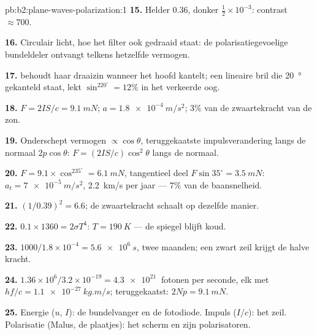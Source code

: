 \begin{solution}{pb:b2:plane-waves-polarization:1}
\textbf{15.} Helder $0.36$, donker $\tfrac12 \times 10^{-3}$: contrast
$\approx 700$.

\textbf{16.} Circulair licht, hoe het filter ook gedraaid staat: de
polarisatiegevoelige bundeldeler ontvangt telkens hetzelfde vermogen.

\textbf{17.}  behoudt haar draaizin wanneer het hoofd
kantelt; een lineaire bril die \qty{20}{\degree} gekanteld staat, lekt
$\sin^220^\circ = 12\%$ in het verkeerde oog.

\textbf{18.} $F = 2IS/c = \qty{9.1}{mN}$; $a = \qty{1.8e-4}{m/s^2}$; $3\%$
van de zwaartekracht van de zon.

\textbf{19.} Onderschept vermogen $\propto\cos\theta$, teruggekaatste
impulsverandering langs de normaal $2p\cos\theta$: $F = (2IS/c)\cos^2\theta$
langs de normaal.

\textbf{20.} $F = 9.1 \times \cos^235^\circ = \qty{6.1}{mN}$, tangentieel
deel $F\sin35^\circ
= \qty{3.5}{mN}$: $a_t = \qty{7e-5}{m/s^2}$,
\qty{2.2}{km/s} per jaar --- $7\%$ van de baansnelheid.

\textbf{21.} $(1/0.39)^2 = 6.6$; de zwaartekracht schaalt op dezelfde manier.

\textbf{22.} $0.1 \times 1360 = 2\sigma T^4$: $T = \qty{190}{K}$ --- de
spiegel blijft koud.

\textbf{23.} $1000/1.8 \times 10^{-4} = \qty{5.6e6}{s}$, twee maanden; een
zwart zeil krijgt de halve kracht.

\textbf{24.} $1.36 \times 10^6/3.2 \times 10^{-19} = \qty{4.3e21}{}$ fotonen
per seconde, elk met $hf/c = \qty{1.1e-27}{kg.m/s}$; teruggekaatst:
$2Np = \qty{9.1}{mN}$.

\textbf{25.} Energie ($u$, $I$): de bundelvanger en de fotodiode. Impuls
($I/c$): het zeil. Polarisatie (Malus, de plaatjes): het scherm en zijn
polarisatoren.
\end{solution}
